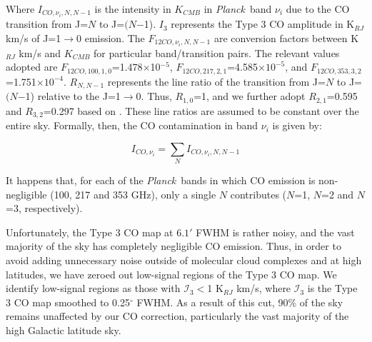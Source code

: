 \documentclass{emulateapj}
\newcommand{\PLANCK}{{\it Planck}}
\begin{document}
Where $I_{CO, \nu_i, N, N-1}$ is the intensity in $K_{CMB}$ in \PLANCK~band 
$\nu_i$ due to the CO transition from J=$N$ to J=$(N$$-$1). $I_3$ represents 
the Type 3 CO amplitude in  K$_{RJ}$ km/s of J=1$\rightarrow$0 emission. The 
$F_{12CO, \nu_i, N, N-1}$ are conversion factors between K$_{RJ}$ km/s and 
$K_{CMB}$ for particular band/transition pairs. The relevant values adopted are
$F_{12CO, 100, 1, 0}$=1.478$\times$10$^{-5}$, 
$F_{12CO, 217, 2, 1}$=4.585$\times$$10^{-5}$, and 
$F_{12CO, 353, 3, 2}$=1.751$\times$$10^{-4}$.
$R_{N, N-1}$ represents the line ratio of the transition from J=$N$ to 
J=$(N$$-$1) relative to the J=1$\rightarrow$0. Thus, $R_{1,0}$=1, and we 
further adopt $R_{2,1}$=0.595 and $R_{3,2}$=0.297 based on \cite{planckco}. 
These line ratios are assumed to be constant over the entire sky. Formally, 
then, the CO contamination in band $\nu_i$ is given by:

\begin{equation}
I_{CO, \nu_i} = \sum\limits_{N} I_{CO, \nu_i, N, N-1}
\end{equation}

It happens that, for each of the \PLANCK~bands in which CO emission is
non-negligible (100, 217 and 353 GHz), only a single $N$ contributes ($N$=1, 
$N$=2 and $N$=3, respectively). 

Unfortunately, the Type 3 CO map at $6.1'$ FWHM is rather noisy, and the vast
 majority of the sky has completely negligible CO emission. Thus, in order to 
avoid adding unnecessary noise outside of molecular cloud complexes and at high
 latitudes, we have zeroed out low-signal regions of the Type 3 CO map. We 
identify  low-signal regions as those with $\mathcal{I}_3$$<$1 K$_{RJ}$ km/s, 
where $\mathcal{I}_3$ is the Type 3 CO map smoothed to 0.25$^{\circ}$ FWHM. As 
a result of this cut, 90\% of the sky remains unaffected by our CO correction, 
particularly the vast majority of the high Galactic latitude sky.




\end{document}

